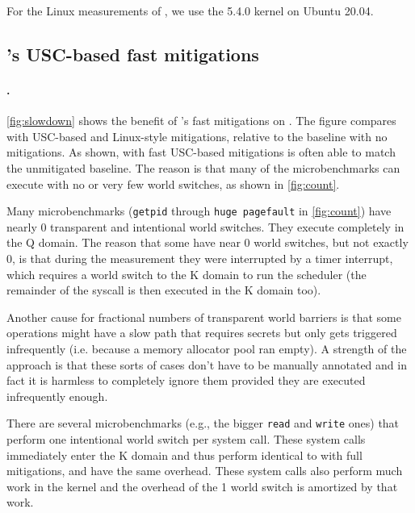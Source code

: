 For the Linux measurements of \bench, we use the 5.4.0 kernel on Ubuntu 20.04.


\subsection*{\sys's USC-based fast mitigations}
\label{ss:faster}

\paragraph{\bench.}

\autoref{fig:slowdown} shows the benefit of \sys's fast mitigations on
\bench.  The figure compares \sys with USC-based and Linux-style mitigations,
relative to the baseline with no mitigations.
As shown, \sys with fast USC-based mitigations is often able to
match the unmitigated baseline.  The reason is that many of the microbenchmarks can
execute with no or very few world switches, as shown in
\autoref{fig:count}.

Many microbenchmarks (\texttt{getpid} through \texttt{huge pagefault}
in \autoref{fig:count}) have nearly 0 transparent and intentional
world switches. They execute completely in the Q domain. The
reason that some have near 0 world switches, but not exactly 0, is
that during the measurement they were interrupted by a timer
interrupt, which requires a world switch to the K domain to run the
scheduler (the remainder of the syscall is then executed in the K
domain too).

Another cause for fractional numbers of transparent world
barriers is that some operations might have a slow path that requires
secrets but only gets triggered infrequently (i.e. because a memory
allocator pool ran empty). A strength of the \sys approach is that these
sorts of cases don't have to be manually annotated and in fact it is
harmless to completely ignore them provided they are executed infrequently
enough.

There are several microbenchmarks (e.g., the bigger \texttt{read} and
\texttt{write} ones) that perform one intentional world switch per
system call.  These system calls immediately enter the K domain and
thus perform identical to \sys with full mitigations, and have the
same overhead.  These system calls also perform much work in the kernel and
the overhead of the 1 world switch is amortized by that work.

